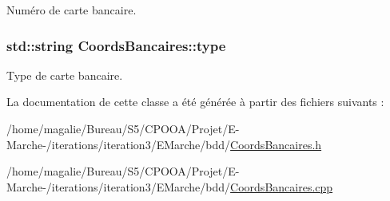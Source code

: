 Numéro de carte bancaire. 

\hypertarget{class_coords_bancaires_ad34142224a2753ad54dddf8d537564b1}{
\subsubsection[{type}]{\setlength{\rightskip}{0pt plus 5cm}std\-::string Coords\-Bancaires\-::type\hspace{0.3cm}{\ttfamily [protected]}}}\label{class_coords_bancaires_ad34142224a2753ad54dddf8d537564b1}


Type de carte bancaire. 



La documentation de cette classe a été générée à partir des fichiers suivants \-:\begin{DoxyCompactItemize}
\item 
/home/magalie/\-Bureau/\-S5/\-C\-P\-O\-O\-A/\-Projet/\-E-\/\-Marche-\//iterations/iteration3/\-E\-Marche/bdd/\hyperlink{_coords_bancaires_8h}{Coords\-Bancaires.\-h}\item 
/home/magalie/\-Bureau/\-S5/\-C\-P\-O\-O\-A/\-Projet/\-E-\/\-Marche-\//iterations/iteration3/\-E\-Marche/bdd/\hyperlink{_coords_bancaires_8cpp}{Coords\-Bancaires.\-cpp}\end{DoxyCompactItemize}

